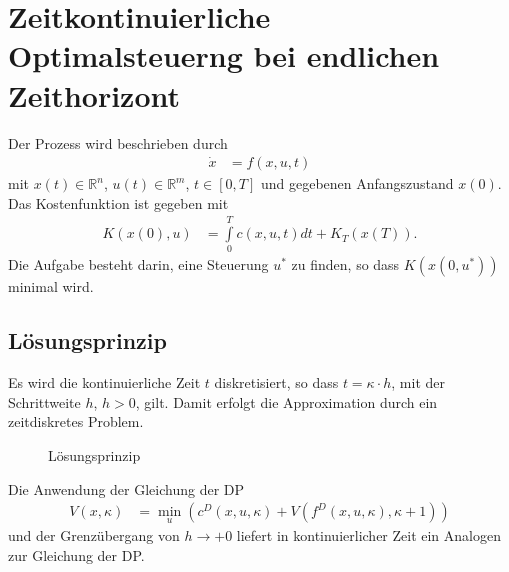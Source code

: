\section{Zeitkontinuierliche Optimalsteuerng bei endlichen Zeithorizont}
\label{sec:3_3_zeitkont_opt_endl}
Der Prozess wird beschrieben durch
\begin{align}
	\dot{x} & = f(x,u,t)
\end{align}
mit $x(t)\in\mathbb{R}^n$, $u(t)\in\mathbb{R}^m$, $t\in[0,T]$ und gegebenen Anfangszustand $x(0)$.\\
Das Kostenfunktion ist gegeben mit
\begin{align}
	K(x(0),u) & = \int\limits_0^T c(x,u,t)dt + K_T(x(T)).
\end{align}
Die Aufgabe besteht darin, eine Steuerung $u^{\ast}$ zu finden, so dass $K\left(x(0,u^{\ast}) \right)$ minimal wird.
\subsection{Lösungsprinzip}
Es wird die kontinuierliche Zeit $t$ diskretisiert, so dass $t=\kappa\cdot h$, mit der Schrittweite $h$, $h>0$, gilt. Damit erfolgt die Approximation durch ein zeitdiskretes Problem. 
\begin{figure}[htb]
	\centering
	
	\caption{Lösungsprinzip}
	\label{fig:kap_3_loesungsprinzip}
\end{figure}
Die Anwendung der Gleichung der \ac{DP} 
\begin{align}
	V(x,\kappa) & = \min\limits_{u}\left(c^D(x, u, \kappa) + V\left(f^D(x, u ,\kappa),\kappa+1 \right) \right)
\end{align}
und der Grenzübergang von $h\rightarrow +0$ liefert in kontinuierlicher Zeit ein Analogen zur Gleichung der \ac{DP}.

